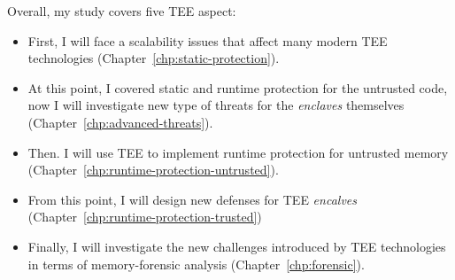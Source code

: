 Overall, my study covers five TEE aspect:
\begin{itemize}
	\item {} First, I will face a 
	scalability issues that affect many modern	TEE technologies 
	(Chapter~\ref{chp:static-protection}).
	
	\item {} At this point, I covered static and runtime 
	protection for the untrusted code, now I will investigate new type of 
	threats for the \emph{enclaves} themselves 	
	(Chapter~\ref{chp:advanced-threats}).
	
	\item {} Then. I will use TEE to 
	implement runtime protection for untrusted memory 
	(Chapter~\ref{chp:runtime-protection-untrusted}).
	
	\item {} From this point, I will 
	design new defenses for TEE \emph{encalves} 	
	(Chapter~\ref{chp:runtime-protection-trusted})
	
	\item {} Finally, I will investigate the new 
	challenges introduced by TEE technologies in terms of memory-forensic 
	analysis (Chapter~\ref{chp:forensic}).
\end{itemize}

